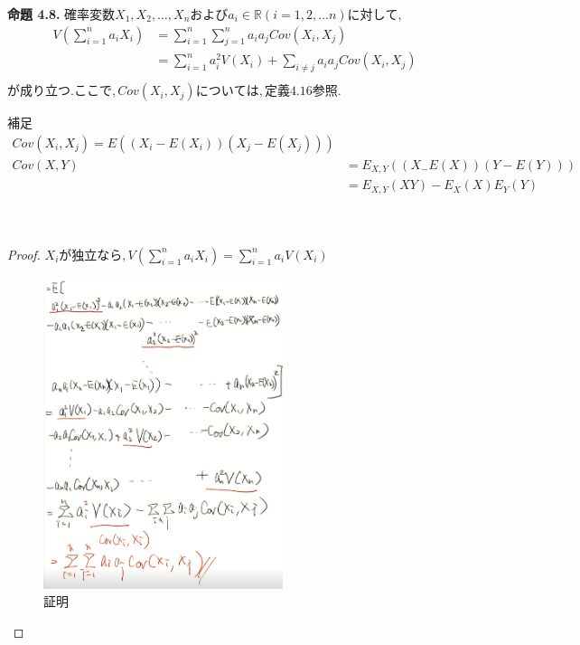 \documentclass[dvipdfmx,10pt, a4j]{jarticle}
\theoremstyle{definition}
\begin{document}
\noindent
\textbf{命題 4.8.} $確率変数 X_1, X_2, \dots, X_n および a_i \in \mathbb{R} (i = 1,2, \dots n)に対して,$\\
\begin{align*}
    V \left(\sum_{i=1}^{n}a_i X_i \right) &= \sum_{i=1}^{n}\sum_{j=1}^{n}a_i a_j Cov(X_i, X_j)\\
    &= \sum_{i=1}^{n}a_i^2V(X_i) + \sum_{i \neq j}a_i a_j Cov(X_i, X_j)\\
\end{align*}
$が成り立つ.ここで, Cov(X_i, X_j)については, 定義4.16参照.$\\
\begin{itembox}[l]{補足}
    \begin{align*}
        Cov(X_i, X_j) = E((X_i - E(X_i))(X_j - E(X_j)))\\
        Cov(X, Y) &= E_{X, Y}((X_ - E(X))(Y - E(Y)))\\
        &= E_{X, Y}(X Y) - E_{X}(X)E_{Y}(Y)\\
    \end{align*}
\end{itembox}\\
\begin{proof}
    $X_i が独立なら, V(\sum_{i=1}^{n}a_iX_i) = \sum_{i=1}^{n}a_iV(X_i)$\\
    \begin{figure}[htbp]
    \begin{center}
    \includegraphics[width=7.0cm]{D_10/img_4.png}
    \caption{証明}
    \end{center}
    \end{figure}
\end{proof}
\end{document}
